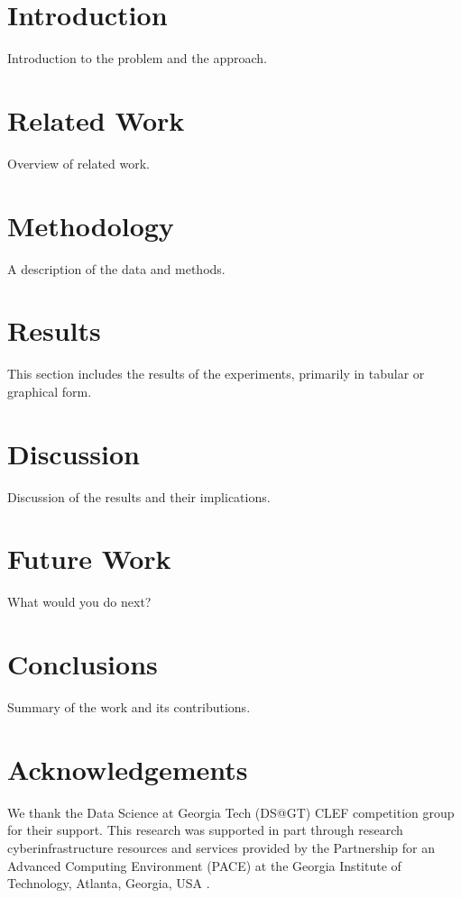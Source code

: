 \section{Introduction}

Introduction to the problem and the approach.

\section{Related Work}

Overview of related work.

\section{Methodology}

A description of the data and methods.

\section{Results}

This section includes the results of the experiments, primarily in tabular or graphical form.

\section{Discussion}

Discussion of the results and their implications.

\section{Future Work}

What would you do next?

\section{Conclusions}

Summary of the work and its contributions.

\section*{Acknowledgements}

We thank the Data Science at Georgia Tech (DS@GT) CLEF competition group for their support.
This research was supported in part through research cyberinfrastructure resources and services provided by the Partnership for an Advanced Computing Environment (PACE) at the Georgia Institute of Technology, Atlanta, Georgia, USA \cite{PACE}. 

